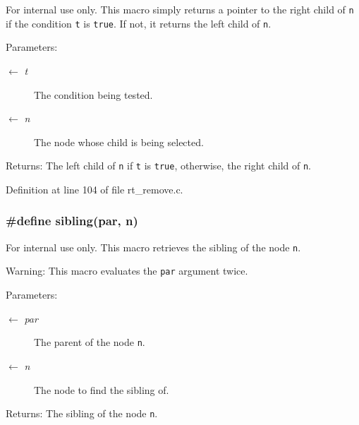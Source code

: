 \begin{Desc}
\item[For internal use only.]
This macro simply returns a pointer to the right child of {\tt n} if the condition {\tt t} is {\tt true}. If not, it returns the left child of {\tt n}.

\begin{Desc}
\item[Parameters:]
\begin{description}
\item[\mbox{$\leftarrow$} {\em t}]The condition being tested. \item[\mbox{$\leftarrow$} {\em n}]The node whose child is being selected.\end{description}
\end{Desc}
\begin{Desc}
\item[Returns:]The left child of {\tt n} if {\tt t} is {\tt true}, otherwise, the right child of {\tt n}.\end{Desc}
\end{Desc}


Definition at line 104 of file rt\_\-remove.c.\hypertarget{group__dbprim__rbtree_ga50}{
\subsubsection[sibling]{\setlength{\rightskip}{0pt plus 5cm}\#define sibling(par, n)}}
\label{group__dbprim__rbtree_ga50}


\begin{Desc}
\item[For internal use only.]
This macro retrieves the sibling of the node {\tt n}.

\begin{Desc}
\item[Warning:]This macro evaluates the {\tt par} argument twice.\end{Desc}
\begin{Desc}
\item[Parameters:]
\begin{description}
\item[\mbox{$\leftarrow$} {\em par}]The parent of the node {\tt n}. \item[\mbox{$\leftarrow$} {\em n}]The node to find the sibling of.\end{description}
\end{Desc}
\begin{Desc}
\item[Returns:]The sibling of the node {\tt n}.\end{Desc}
\end{Desc}


